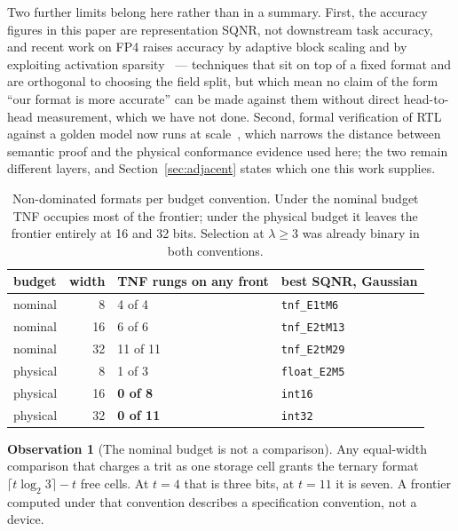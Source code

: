 \documentclass[11pt]{article}
\theoremstyle{definition}
\newtheorem{observation}[theorem]{Observation}
\begin{document}
Two further limits belong here rather than in a summary. First, the accuracy
figures in this paper are representation SQNR, not downstream task accuracy, and
recent work on FP4 raises accuracy by adaptive block scaling and by exploiting
activation sparsity~\cite{cook2025fourofsix,meng2026sharq} --- techniques that sit
on top of a fixed format and are orthogonal to choosing the field split, but which
mean no claim of the form ``our format is more accurate'' can be made against them
without direct head-to-head measurement, which we have not done. Second, formal
verification of RTL against a golden model now runs at
scale~\cite{li2026formalrtl}, which narrows the distance between semantic proof
and the physical conformance evidence used here; the two remain different layers,
and Section~\ref{sec:adjacent} states which one this work supplies.

\begin{table}[t]\centering
\caption{Non-dominated formats per budget convention. Under the nominal budget
TNF occupies most of the frontier; under the physical budget it leaves the
frontier entirely at 16 and 32 bits. Selection at $\lambda \ge 3$ was already
binary in both conventions.}
\label{tab:paretobudget}
\begin{tabular}{lrll}
\toprule
budget & width & TNF rungs on any front & best SQNR, Gaussian \\
\midrule
nominal  & 8  & 4 of 4  & \texttt{tnf\_E1tM6} \\
nominal  & 16 & 6 of 6  & \texttt{tnf\_E2tM13} \\
nominal  & 32 & 11 of 11 & \texttt{tnf\_E2tM29} \\
\addlinespace
physical & 8  & 1 of 3  & \texttt{float\_E2M5} \\
physical & 16 & \textbf{0 of 8} & \texttt{int16} \\
physical & 32 & \textbf{0 of 11} & \texttt{int32} \\
\bottomrule
\end{tabular}
\end{table}

\begin{observation}[The nominal budget is not a comparison]
\label{obs:budget}
Any equal-width comparison that charges a trit as one storage cell grants the
ternary format $\lceil t\log_2 3\rceil - t$ free cells. At $t = 4$ that is three
bits, at $t = 11$ it is seven. A frontier computed under that convention
describes a specification convention, not a device.
\end{observation}
\end{document}

